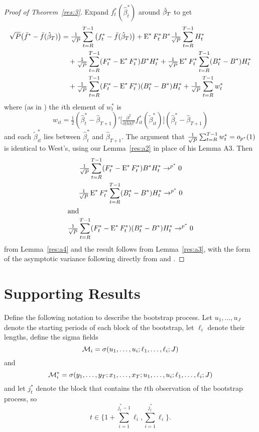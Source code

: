 \documentclass[12pt,fleqn]{article}
\begin{document}
\newcommand{\WesA}[1][]{\oclt{t}
  (F_t^{#1} - \E^{#1} F_t^{#1}) B^{#1} H_t^{#1}}
\newcommand{\WesB}[1][]{\tfrac{1}{\sqrt{P}} \E^{#1} F_t^{#1} \osum{t} (B_t^{#1} -
  B^{#1}) H_t^{#1}}
\newcommand{\WesC}[1][]{\oclt{t}
  (F_t^{#1} - \E^{#1} F_t^{#1}) (B_t^{#1} - B^{#1}) H_t^{#1}}
\begin{proof}[Proof of Theorem~\ref{res:3}]
  Expand $f_t^{*}(\hat{\beta}_t^{*})$ around $\btrue[*]$
  to get
  \begin{align*}
    \sqrt{P} \big(\bar{f}^{*} - \bar{f}(\btrue[*])\big) &= \oclt{t}
    \big(f_t^{*} - \bar{f}(\btrue[*])\big) +
    \E^* F_t^{*} B^{*} \oclt{t} H_t^* \\
    & \quad + \WesA[*] + \WesB[*] \\ & \quad + \WesC[*] + \oclt{t} w_t^*
  \end{align*}
  where (as in \citealp{Wes:96}) the $i$th element of $w_t^*$ is
  \begin{equation*}
    w_{it} = \tfrac12 (\hat\beta_t^* - \hat\beta_{T+1})'
    \Big[\tfrac{\partial^2}{\partial \beta \partial\beta'}
    f_{it}^*(\tilde\beta_{it}^*) \Big]
    (\hat\beta_t^* - \hat\beta_{T+1})
  \end{equation*}
  and each $\tilde\beta_{it}^*$ lies between $\hat\beta_t^*$ and
  $\hat\beta_{T+1}$.  The argument that $\tfrac{1}{\sqrt{P}} \sum_{t=R}^{T-1} w_t^* = o_{p^*}(1)$ is
  identical to West's, using our Lemma~\ref{res:a2} in place of his
  Lemma A3.  Then
  \begin{gather}
    \WesA[*] \to^{p^*} 0 \label{eq:7} \\
    \WesB[*] \to^{p^*} 0 \label{eq:9} \\
  \intertext{and}
    \WesC[*] \to^{p^*} 0 \label{eq:10}
  \end{gather}
  from Lemma~\ref{res:a4} and the result follows from
  Lemma~\ref{res:a3}, with the form of the asymptotic variance
  following directly from \citet{Wes:96} and \citet{WeM:98}.
\end{proof}

\section{Supporting Results}

Define the following notation to describe the bootstrap process. Let
$u_1,\dots,u_{J}$ denote the starting periods of each block of the
bootstrap, let $\ell_i$ denote their lengths, define the sigma fields
\[
  \mathcal{M}_i = \sigma(u_1,\dots,u_i; \ell_1,\dots,\ell_i; J)
\]
and
\[
  \mathcal{M}_i^* = \sigma(y_1,\dots,y_T; x_1,\dots, x_T;u_1,\dots,u_i; \ell_1,\dots,\ell_i; J)
\]
and let $j^*_t$ denote the block that contains the $t$th observation
of the bootstrap process, so
\[
  t \in \{1 + \sum_{i=1}^{j^*_t-1} \ell_i, \sum_{i=1}^{j^*_t} \ell_i\}.
\]
\end{document}

